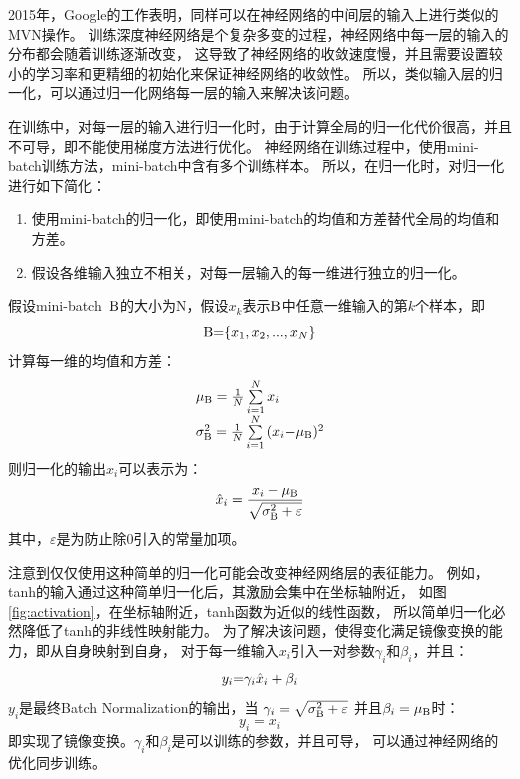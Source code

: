 2015年，Google的工作表明，同样可以在神经网络的中间层的输入上进行类似的MVN操作。
训练深度神经网络是个复杂多变的过程，神经网络中每一层的输入的分布都会随着训练逐渐改变，
这导致了神经网络的收敛速度慢，并且需要设置较小的学习率和更精细的初始化来保证神经网络的收敛性。
所以，类似输入层的归一化，可以通过归一化网络每一层的输入来解决该问题。

在训练中，对每一层的输入进行归一化时，由于计算全局的归一化代价很高，并且不可导，即不能使用梯度方法进行优化。
神经网络在训练过程中，使用mini-batch训练方法，mini-batch中含有多个训练样本。
所以，在归一化时，对归一化进行如下简化：
\begin{enumerate}
\item 使用mini-batch的归一化，即使用mini-batch的均值和方差替代全局的均值和方差。
\item 假设各维输入独立不相关，对每一层输入的每一维进行独立的归一化。
\end{enumerate}

假设mini-batch~${\rm B}$的大小为N，假设$x_k$表示${\rm B}$中任意一维输入的第$k$个样本，即
\begin{equation}
{\rm B}{\rm{ = }}\{ {x_1},{x_2},...,{x_N}\}
\end{equation}
计算每一维的均值和方差：
\begin{equation}
\begin{array}{l}
{\mu _{\rm B}} = \frac{1}{N}\sum\limits_{i = 1}^N {{x_i}} \\
\sigma _{\rm B}^2 = \frac{1}{N}\sum\limits_{i = 1}^N {({x_i} - } {\mu _{\rm B}}{)^2}
\end{array}
\end{equation}
则归一化的输出${\hat x}_i$可以表示为：
\begin{equation}
{{\hat x}_i} = \frac{{{x_i} - {\mu _{\rm B}}}}{{\sqrt {\sigma _{\rm B}^2 + \varepsilon } }}
\end{equation}
其中，$\varepsilon$是为防止除0引入的常量加项。

注意到仅仅使用这种简单的归一化可能会改变神经网络层的表征能力。
例如，tanh的输入通过这种简单归一化后，其激励会集中在坐标轴附近，
如图\ref{fig:activation}，在坐标轴附近，tanh函数为近似的线性函数，
所以简单归一化必然降低了tanh的非线性映射能力。
为了解决该问题，使得变化满足镜像变换的能力，即从自身映射到自身，
对于每一维输入$x_i$引入一对参数$\gamma _i$和$\beta _i$，并且：
\begin{equation}
{y_i}{\rm{ = }}{\gamma _i}{{\hat x}_i} + {\beta _i}
\end{equation}
$y_i$是最终Batch Normalization的输出，当
${\gamma _i} = \sqrt {\sigma _{\rm B}^2 + \varepsilon }$
并且${\beta _i} = {\mu _{\rm B}}$时：
\begin{equation}
{y_i} = {x_i}
\end{equation}
即实现了镜像变换。$\gamma _i$和$\beta _i$是可以训练的参数，并且可导，
可以通过神经网络的优化同步训练。

